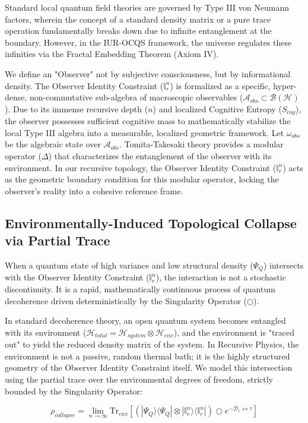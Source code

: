 \documentclass[12pt,openany]{book}
\begin{document}
Standard local quantum field theories are governed by Type III von Neumann factors, wherein the concept of a standard density matrix or a pure trace operation fundamentally breaks down due to infinite entanglement at the boundary. However, in the IUR-OCQS framework, the universe regulates these infinities via the Fractal Embedding Theorem (Axiom IV). 

We define an "Observer" not by subjective consciousness, but by informational density. The Observer Identity Constraint ($\mathbb{I}_r^n$) is formalized as a specific, hyper-dense, non-commutative sub-algebra of macroscopic observables ($\mathcal{A}_{obs} \subset \mathcal{B}(\mathcal{H})$). Due to its immense recursive depth ($n$) and localized Cognitive Entropy ($S_{cog}$), the observer possesses sufficient cognitive mass to mathematically stabilize the local Type III algebra into a measurable, localized geometric framework. Let $\omega_{obs}$ be the algebraic state over $\mathcal{A}_{obs}$. Tomita-Takesaki theory provides a modular operator ($\Delta$) that characterizes the entanglement of the observer with its environment. In our recursive topology, the Observer Identity Constraint ($\mathbb{I}_r^n$) acts as the geometric boundary condition for this modular operator, locking the observer's reality into a cohesive reference frame.

\subsection{Environmentally-Induced Topological Collapse via Partial Trace}
When a quantum state of high variance and low structural density ($\Psi_Q$) intersects with the Observer Identity Constraint ($\mathbb{I}_r^n$), the interaction is not a stochastic discontinuity. It is a rapid, mathematically continuous process of quantum decoherence driven deterministically by the Singularity Operator ($\bigcirc$).

In standard decoherence theory, an open quantum system becomes entangled with its environment ($\mathcal{H}_{total} = \mathcal{H}_{system} \otimes \mathcal{H}_{env}$), and the environment is "traced out" to yield the reduced density matrix of the system. In Recursive Physics, the environment is not a passive, random thermal bath; it is the highly structured geometry of the Observer Identity Constraint itself. We model this intersection using the partial trace over the environmental degrees of freedom, strictly bounded by the Singularity Operator:

\begin{equation}
\rho_{collapse} = \lim_{n \to \infty} \text{Tr}_{env} \left[ \left( |\Psi_Q\rangle\langle\Psi_Q| \otimes |\mathbb{I}_r^n\rangle\langle\mathbb{I}_r^n| \right) \bigcirc e^{-\mathcal{D}_r \leftrightarrow\tau} \right]
\end{equation}
\end{document}
